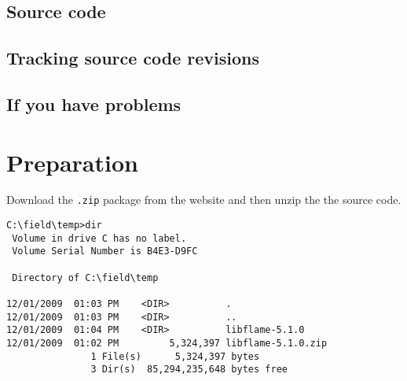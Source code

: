 \subsection{Source code}






\subsection{Tracking source code revisions}





\subsection{If you have problems}





%
%
%
%



\section{Preparation}

Download the {\tt .zip} package from the website and then unzip the
the source code.

\begin{Verbatim}[frame=single,framesep=2.5mm,xleftmargin=5mm,fontsize=\footnotesize]
C:\field\temp>dir
 Volume in drive C has no label.
 Volume Serial Number is B4E3-D9FC

 Directory of C:\field\temp

12/01/2009  01:03 PM    <DIR>          .
12/01/2009  01:03 PM    <DIR>          ..
12/01/2009  01:04 PM    <DIR>          libflame-5.1.0
12/01/2009  01:02 PM         5,324,397 libflame-5.1.0.zip
               1 File(s)      5,324,397 bytes
               3 Dir(s)  85,294,235,648 bytes free
\end{Verbatim}

